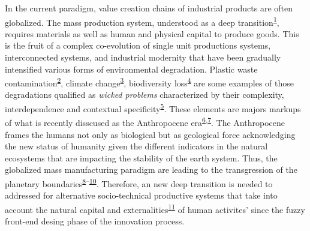\documentclass[
  11pt,
  a4paperpaper,
  onecolumn]{article}
\begin{document}
In the current paradigm, value creation chains of industrial products
are often globalized. The mass production system, understood as a deep
transition\textsuperscript{\protect\hyperlink{ref-kanger2022}{1}},
requires materials as well as human and physical capital to produce
goods. This is the fruit of a complex co-evolution of single unit
productions systems, interconnected systems, and industrial modernity
that have been gradually intensified various forms of environmental
degradation. Plastic waste
contamination\textsuperscript{\protect\hyperlink{ref-de-la-torre2021}{2}},
climate change\textsuperscript{\protect\hyperlink{ref-stoddard2021}{3}},
biodiversity
loss\textsuperscript{\protect\hyperlink{ref-hermoso2022}{4}} are some
examples of those degradations qualified as \emph{wicked problems}
characterized by their complexity, interdependence and contextual
specificity\textsuperscript{\protect\hyperlink{ref-Zivkovic2018}{5}}.
These elements are majors markups of what is recently disscused as the
Anthropocene
era\textsuperscript{\protect\hyperlink{ref-steffen2018}{6},\protect\hyperlink{ref-steffen2011}{7}}.
The Anthropocene frames the humans not only as biological but as
geological force acknowledging the new status of humanity given the
different indicators in the natural ecosystems that are impacting the
stability of the earth system. Thus, the globalized mass manufacturing
paradigm are leading to the transgression of the planetary
boundaries\textsuperscript{\protect\hyperlink{ref-ONeill2018}{8}--\protect\hyperlink{ref-Rockstrom2009}{10}}.
Therefore, an new deep transition is needed to addressed for alternative
socio-technical productive systems that take into account the natural
capital and
externalities\textsuperscript{\protect\hyperlink{ref-zhen2021}{11}} of
human activites' since the fuzzy front-end desing phase of the
innovation process.
\end{document}
